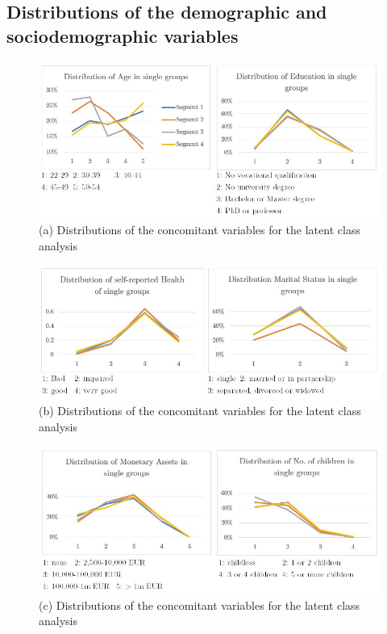 \documentclass[12pt, abstracton]{article}
\begin{document}
\subsection{Distributions of the demographic and sociodemographic variables}
\begin{figure}[H]
	\begin{center}
		\includegraphics[width=\linewidth]{Dist1.jpg}
		\caption{(a) Distributions of the concomitant variables for the latent class analysis}
		\label{fig:DistSocioVars}
	\end{center}	
\end{figure}
\begin{figure}[H]
	\begin{center}
		\includegraphics[width=\linewidth]{Dist2.jpg}
		\caption*{(b) Distributions of the concomitant variables for the latent class analysis}
		\label{fig:DistSocioVars}
	\end{center}	
\end{figure}
\begin{figure}[H]
	\begin{center}
		\includegraphics[width=\linewidth]{Dist3.jpg}
		\caption*{(c) Distributions of the concomitant variables for the latent class analysis}
		\label{fig:DistSocioVars}
	\end{center}	
\end{figure}
\end{document}
